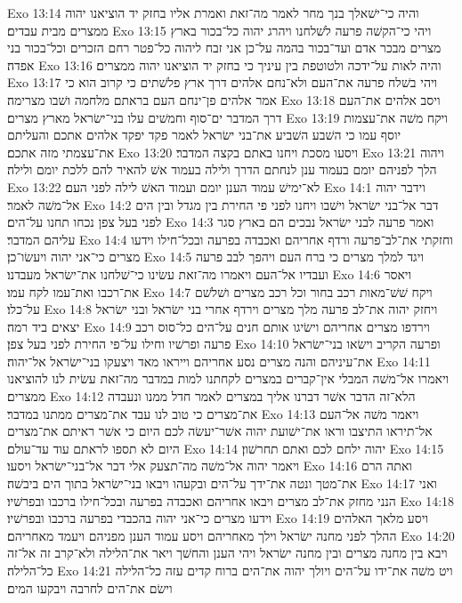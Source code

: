 Exo 13:14  והיה כי־ישׁאלך בנך מחר לאמר מה־זאת ואמרת אליו בחזק יד הוציאנו יהוה ממצרים מבית עבדים׃
Exo 13:15  ויהי כי־הקשׁה פרעה לשׁלחנו ויהרג יהוה כל־בכור בארץ מצרים מבכר אדם ועד־בכור בהמה על־כן אני זבח ליהוה כל־פטר רחם הזכרים וכל־בכור בני אפדה׃
Exo 13:16  והיה לאות על־ידכה ולטוטפת בין עיניך כי בחזק יד הוציאנו יהוה ממצרים׃
Exo 13:17  ויהי בשׁלח פרעה את־העם ולא־נחם אלהים דרך ארץ פלשׁתים כי קרוב הוא כי אמר אלהים פן־ינחם העם בראתם מלחמה ושׁבו מצרימה׃
Exo 13:18  ויסב אלהים את־העם דרך המדבר ים־סוף וחמשׁים עלו בני־ישׂראל מארץ מצרים׃
Exo 13:19  ויקח משׁה את־עצמות יוסף עמו כי השׁבע השׁביע את־בני ישׂראל לאמר פקד יפקד אלהים אתכם והעליתם את־עצמתי מזה אתכם׃
Exo 13:20  ויסעו מסכת ויחנו באתם בקצה המדבר׃
Exo 13:21  ויהוה הלך לפניהם יומם בעמוד ענן לנחתם הדרך ולילה בעמוד אשׁ להאיר להם ללכת יומם ולילה׃
Exo 13:22  לא־ימישׁ עמוד הענן יומם ועמוד האשׁ לילה לפני העם׃
Exo 14:1  וידבר יהוה אל־משׁה לאמר׃
Exo 14:2  דבר אל־בני ישׂראל וישׁבו ויחנו לפני פי החירת בין מגדל ובין הים לפני בעל צפן נכחו תחנו על־הים׃
Exo 14:3  ואמר פרעה לבני ישׂראל נבכים הם בארץ סגר עליהם המדבר׃
Exo 14:4  וחזקתי את־לב־פרעה ורדף אחריהם ואכבדה בפרעה ובכל־חילו וידעו מצרים כי־אני יהוה ויעשׂו־כן׃
Exo 14:5  ויגד למלך מצרים כי ברח העם ויהפך לבב פרעה ועבדיו אל־העם ויאמרו מה־זאת עשׂינו כי־שׁלחנו את־ישׂראל מעבדנו׃
Exo 14:6  ויאסר את־רכבו ואת־עמו לקח עמו׃
Exo 14:7  ויקח שׁשׁ־מאות רכב בחור וכל רכב מצרים ושׁלשׁם על־כלו׃
Exo 14:8  ויחזק יהוה את־לב פרעה מלך מצרים וירדף אחרי בני ישׂראל ובני ישׂראל יצאים ביד רמה׃
Exo 14:9  וירדפו מצרים אחריהם וישׂיגו אותם חנים על־הים כל־סוס רכב פרעה ופרשׁיו וחילו על־פי החירת לפני בעל צפן׃
Exo 14:10  ופרעה הקריב וישׂאו בני־ישׂראל את־עיניהם והנה מצרים נסע אחריהם וייראו מאד ויצעקו בני־ישׂראל אל־יהוה׃
Exo 14:11  ויאמרו אל־משׁה המבלי אין־קברים במצרים לקחתנו למות במדבר מה־זאת עשׂית לנו להוציאנו ממצרים׃
Exo 14:12  הלא־זה הדבר אשׁר דברנו אליך במצרים לאמר חדל ממנו ונעבדה את־מצרים כי טוב לנו עבד את־מצרים ממתנו במדבר׃
Exo 14:13  ויאמר משׁה אל־העם אל־תיראו התיצבו וראו את־ישׁועת יהוה אשׁר־יעשׂה לכם היום כי אשׁר ראיתם את־מצרים היום לא תספו לראתם עוד עד־עולם׃
Exo 14:14  יהוה ילחם לכם ואתם תחרשׁון׃
Exo 14:15  ויאמר יהוה אל־משׁה מה־תצעק אלי דבר אל־בני־ישׂראל ויסעו׃
Exo 14:16  ואתה הרם את־מטך ונטה את־ידך על־הים ובקעהו ויבאו בני־ישׂראל בתוך הים ביבשׁה׃
Exo 14:17  ואני הנני מחזק את־לב מצרים ויבאו אחריהם ואכבדה בפרעה ובכל־חילו ברכבו ובפרשׁיו׃
Exo 14:18  וידעו מצרים כי־אני יהוה בהכבדי בפרעה ברכבו ובפרשׁיו׃
Exo 14:19  ויסע מלאך האלהים ההלך לפני מחנה ישׂראל וילך מאחריהם ויסע עמוד הענן מפניהם ויעמד מאחריהם׃
Exo 14:20  ויבא בין מחנה מצרים ובין מחנה ישׂראל ויהי הענן והחשׁך ויאר את־הלילה ולא־קרב זה אל־זה כל־הלילה׃
Exo 14:21  ויט משׁה את־ידו על־הים ויולך יהוה את־הים ברוח קדים עזה כל־הלילה וישׂם את־הים לחרבה ויבקעו המים׃
